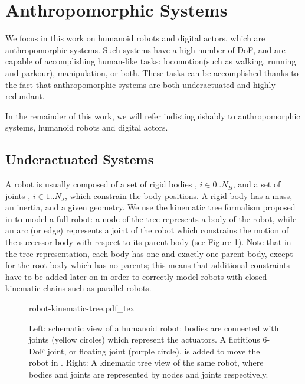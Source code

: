 \section{Anthropomorphic Systems}
\label{sec:chap1-anthropomorphic-systems}

We focus in this work on humanoid robots and digital actors, which are
anthropomorphic systems. Such systems have a high number of DoF, and
are capable of accomplishing human-like tasks: locomotion(such as
walking, running and parkour), manipulation, or both. These tasks can
be accomplished thanks to the fact that anthropomorphic systems are
both underactuated and highly redundant.

In the remainder of this work, we will refer indistinguishably to
anthropomorphic systems, humanoid robots and digital actors.

\subsection{Underactuated Systems}
\label{subsec:chap1-underactuated-systems}

A robot {\robot} is usually composed of a set of rigid bodies
, $i \in 0..N_B$, and a set of joints , $i \in
1..N_J$, which constrain the body positions. A rigid body has a mass,
an inertia, and a given geometry. We use the kinematic tree formalism
proposed in \cite{feat08} to model a full robot: a node of the tree
represents a body of the robot, while an arc (or edge) represents a
joint  of the robot which constrains the motion of the
successor body  with respect to its parent body
 (see Figure
\ref{fig:chap1-robot-kinematic-tree}). Note that in the tree
representation, each body has one and exactly one parent body, except
for the root body which has no parents; this means that additional
constraints have to be added later on in order to correctly model
robots with closed kinematic chains such as parallel robots.

\begin{figure}
  \centering
      {\def\svgwidth{0.8\linewidth}
        
                   {robot-kinematic-tree.pdf_tex}}
      \caption{Left: schematic view of a humanoid robot: bodies
        are connected with joints (yellow circles) which represent the
        actuators. A fictitious 6-DoF joint, or floating joint (purple
        circle), is added to move the robot in {\segroup}. Right: A
        kinematic tree view of the same robot, where bodies and joints
        are represented by nodes and joints respectively.}
      \label{fig:chap1-robot-kinematic-tree}
\end{figure}

